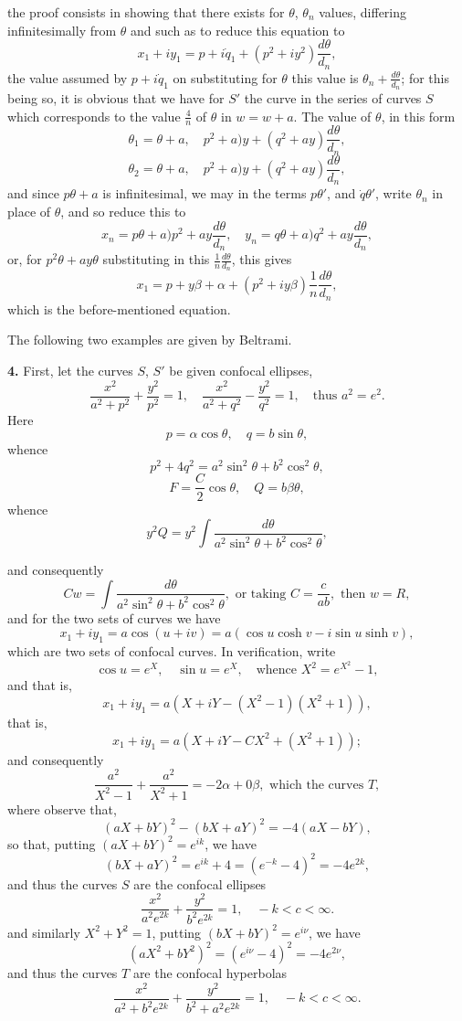 \documentclass[11pt,a4paper]{book}
\begin{document}
the proof consists in showing that there exists for $\theta$, $\theta_n$ values, differing infinitesimally from $\theta$ and such as to reduce this equation to
\[
x_1 + i y_1 = p + i \dot q_1 + (p^2 + iy^2) \frac{d\theta}{d_n},
\]
the value assumed by $p + i\dot q_1$ on substituting for $\theta$ this value is $\theta_n + \frac{d\theta}{d_n}$; for this being so, it is obvious that we have for $S'$ the curve in the series of curves $S$ which corresponds to the value $\frac{4}{n}$ of $\theta$ in $w = w + a$. The value of $\theta$, in this form
\[
\theta_1 = \theta + a, \quad p^2 + a)y + (q^2 + ay)\frac{d\theta}{d_n},
\]
\[
\theta_2 = \theta + a, \quad p^2 + a)y + (q^2 + ay)\frac{d\theta}{d_n},
\]
and since $p\theta + a$ is infinitesimal, we may in the terms $p\theta'$, and $\dot q\theta'$, write $\theta_n$ in place of $\theta$, and so reduce this to
\[
x_n = p\theta + a)p^2 + ay \frac{d\theta}{d_n}, \quad y_n = q\theta + a)q^2 + a y \frac{d\theta}{d_n},
\]
or, for $p^2 \theta + a y\theta$ substituting in this $\frac{1}{n}\frac{d\theta}{d_n}$, this gives
\[
x_1 = p + y\beta + \alpha + (p^2 + i y\beta) \frac{1}{n} \frac{d\theta}{d_n},
\]
which is the before-mentioned equation.

The following two examples are given by Beltrami.

\textbf{4.} First, let the curves $S$, $S'$ be given confocal ellipses,
\[
\frac{x^2}{a^2 + p^2} + \frac{y^2}{p^2} = 1, \quad \frac{x^2}{a^2 + q^2} - \frac{y^2}{q^2} = 1, \quad \text{thus } a^2 = e^2.
\]
Here
\[
p = \alpha \cos \theta, \quad q = b \sin \theta,
\]
whence
\[
p^2 + 4q^2 = a^2 \sin^2 \theta + b^2 \cos^2 \theta,
\]
\[
F = \frac{C}{2} \cos \theta, \quad Q = b\beta\theta,
\]
whence
\[
y^2 Q = y^2 \int \frac{d \theta}{a^2 \sin^2 \theta + b^2 \cos^2 \theta},
\]

and consequently
\[
Cw = \int \frac{d\theta}{a^2 \sin^2 \theta + b^2 \cos^2 \theta}, \text{ or taking } C = \frac{c}{ab}, \text{ then } w = R,
\]
and for the two sets of curves we have
\[
x_1 + iy_1 = a \cos(u + iv) = a(\cos u \cosh v - i \sin u \sinh v),
\]
which are two sets of confocal curves. In verification, write
\[
\cos u = e^{X}, \quad \sin u = e^{X}, \quad \text{whence } X^2 = e^{X^2} - 1,
\]
and that is,
\[
x_1 + iy_1 = a (X + i Y - (X^2 - 1)(X^2 + 1)),
\]
that is,
\[
x_1 + iy_1 = a(X + iY - C X^2 + (X^2 + 1));
\]
and consequently
\[
\frac{a^2}{X^2 - 1} + \frac{a^2}{X^2 + 1} = -2 \alpha + 0\beta, \text{ which the curves } T,
\]
where observe that,
\[
(a X + b Y)^2 - (b X + a Y)^2 = - 4 (a X - b Y),
\]
so that, putting $(a X + b Y)^2 = e^{i k}$, we have
\[
(b X + a Y)^2 = e^{i k} + 4 = (e^{- k} - 4)^2 = - 4 e^{2k},
\]
and thus the curves $S$ are the confocal ellipses
\[
\frac{x^2}{a^2 e^{2k}} + \frac{y^2}{b^2 e^{2k}} = 1, \quad - k < c < \infty.
\]
and similarly $X^2 + Y^2 = 1$, putting $(b X + b Y)^2 = e^{i \nu}$, we have
\[
(a X^2 + b Y^2)^2 = (e^{i \nu} - 4)^2 = - 4 e^{2\nu},
\]
and thus the curves $T$ are the confocal hyperbolas
\[
\frac{x^2}{a^2 + b^2 e^{2k}} + \frac{y^2}{b^2 + a^2 e^{2k}} = 1, \quad -k < c < \infty.
\]
\end{document}
